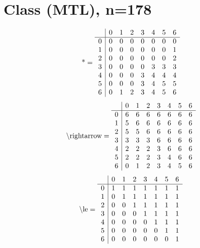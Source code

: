 \documentclass[11pt]{article}
\begin{document}
\section{Class (MTL), n=178}
\[\text{*} = 
\begin{array}{r | r r r r r r r}
 & 0 & 1 & 2 & 3 & 4 & 5 & 6 \\ \hline
0 & 0 & 0 & 0 & 0 & 0 & 0 & 0 \\
1 & 0 & 0 & 0 & 0 & 0 & 0 & 1 \\
2 & 0 & 0 & 0 & 0 & 0 & 0 & 2 \\
3 & 0 & 0 & 0 & 0 & 3 & 3 & 3 \\
4 & 0 & 0 & 0 & 3 & 4 & 4 & 4 \\
5 & 0 & 0 & 0 & 3 & 4 & 5 & 5 \\
6 & 0 & 1 & 2 & 3 & 4 & 5 & 6 \\
\end{array}
\]
\[\text{\textbackslash rightarrow} = 
\begin{array}{r | r r r r r r r}
 & 0 & 1 & 2 & 3 & 4 & 5 & 6 \\ \hline
0 & 6 & 6 & 6 & 6 & 6 & 6 & 6 \\
1 & 5 & 6 & 6 & 6 & 6 & 6 & 6 \\
2 & 5 & 5 & 6 & 6 & 6 & 6 & 6 \\
3 & 3 & 3 & 3 & 6 & 6 & 6 & 6 \\
4 & 2 & 2 & 2 & 3 & 6 & 6 & 6 \\
5 & 2 & 2 & 2 & 3 & 4 & 6 & 6 \\
6 & 0 & 1 & 2 & 3 & 4 & 5 & 6 \\
\end{array}
\]
\[\text{\textbackslash le} = 
\begin{array}{r | r r r r r r r}
 & 0 & 1 & 2 & 3 & 4 & 5 & 6 \\ \hline
0 & 1 & 1 & 1 & 1 & 1 & 1 & 1 \\
1 & 0 & 1 & 1 & 1 & 1 & 1 & 1 \\
2 & 0 & 0 & 1 & 1 & 1 & 1 & 1 \\
3 & 0 & 0 & 0 & 1 & 1 & 1 & 1 \\
4 & 0 & 0 & 0 & 0 & 1 & 1 & 1 \\
5 & 0 & 0 & 0 & 0 & 0 & 1 & 1 \\
6 & 0 & 0 & 0 & 0 & 0 & 0 & 1 \\
\end{array}
\]
\end{document}
